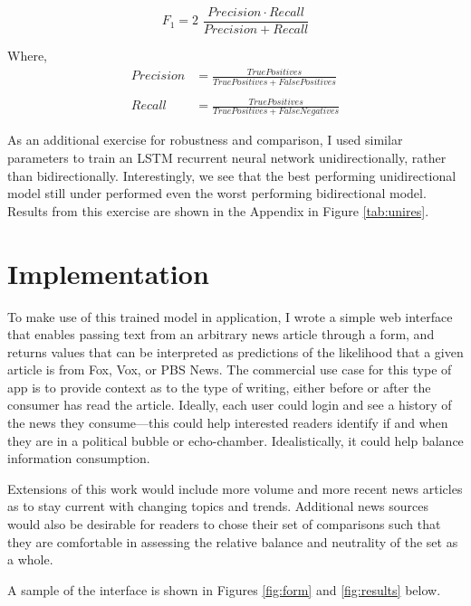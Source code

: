 \documentclass{article}
\begin{document}
	\begin{equation*}
		F_1 =  2 \,\, \frac{Precision \cdot Recall}{Precision + Recall}
	\end{equation*}
	
	Where, 
	\begin{align*}
		Precision &= \frac{True Positives}{True Positives + False Positives}\\ \\
		Recall &= \frac{True Positives}{True Positives + False Negatives}
	\end{align*}
	
	As an additional exercise for robustness and comparison, I used similar parameters to train an LSTM recurrent neural network unidirectionally, rather than bidirectionally. Interestingly, we see that the best performing unidirectional model still under performed even the worst performing bidirectional model. Results from this exercise are shown in the Appendix in Figure \ref{tab:unires}.
	
	
	\section{Implementation}
	
	To make use of this trained model in application, I wrote a simple web interface that enables passing text from an arbitrary news article through a form, and returns values that can be interpreted as predictions of the likelihood that a given article is from Fox, Vox, or PBS News. The commercial use case for this type of app is to provide context as to the type of writing, either before or after the consumer has read the article. Ideally, each user could login and see a history of the news they consume---this could help interested readers identify if and when they are in a political bubble or echo-chamber. Idealistically, it could help balance information consumption. 
	
	Extensions of this work would include more volume and more recent news articles as to stay current with changing topics and trends. Additional news sources would also be desirable for readers to chose their set of comparisons such that they are comfortable in assessing the relative balance and neutrality of the set as a whole. 
	
	A sample of the interface is shown in Figures \ref{fig:form} and \ref{fig:results} below. 	
	
\end{document}
